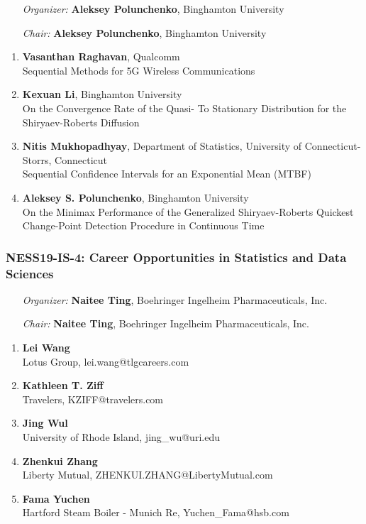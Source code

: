 \begin{enumerate}[align=left]
\item [\emph{Organizer:}] \textbf{Aleksey Polunchenko}, Binghamton University
\item [\emph{Chair:}] \textbf{Aleksey Polunchenko}, Binghamton University
\end{enumerate}

\begin{enumerate}
\item \textbf{Vasanthan Raghavan}, Qualcomm \\
Sequential Methods for 5G Wireless Communications
\item \textbf{Kexuan Li}, Binghamton University \\
On the Convergence Rate of the Quasi- To Stationary Distribution for the Shiryaev-Roberts Diffusion
\item \textbf{Nitis Mukhopadhyay}, Department of Statistics, University of Connecticut-Storrs, Connecticut \\
Sequential Confidence Intervals for an Exponential Mean (MTBF)
\item \textbf{Aleksey S. Polunchenko}, Binghamton University \\
On the Minimax Performance of the Generalized Shiryaev-Roberts Quickest Change-Point Detection Procedure in Continuous Time
\end{enumerate}

\subsubsection*{NESS19-IS-4: Career Opportunities in Statistics and Data Sciences}

\begin{enumerate}[align=left]
\item [\emph{Organizer:}] \textbf{Naitee Ting}, Boehringer Ingelheim Pharmaceuticals, Inc.
\item [\emph{Chair:}] \textbf{Naitee Ting}, Boehringer Ingelheim Pharmaceuticals, Inc.
\end{enumerate}

\begin{enumerate}
\item \textbf{Lei Wang} \\
 Lotus Group, lei.wang@tlgcareers.com
\item \textbf{Kathleen T. Ziff} \\
 Travelers, KZIFF@travelers.com
\item \textbf{Jing Wul} \\
 University of Rhode Island, jing\_wu@uri.edu
\item \textbf{Zhenkui Zhang} \\
 Liberty Mutual, ZHENKUI.ZHANG@LibertyMutual.com
\item \textbf{Fama Yuchen} \\
 Hartford Steam Boiler - Munich Re, Yuchen\_Fama@hsb.com
\end{enumerate}

